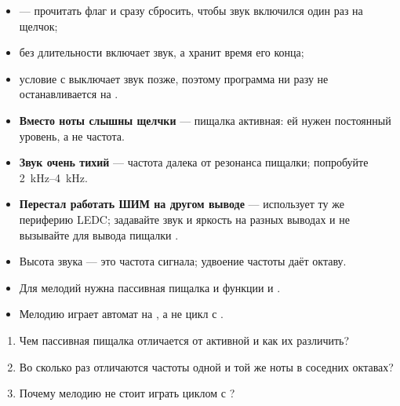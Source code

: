 
\begin{itemize}[leftmargin=*]
  \item {} --- прочитать флаг и сразу сбросить, чтобы звук включился один раз на щелчок;
  \item {} без длительности включает звук, а  хранит время его конца;
  \item условие с  выключает звук позже, поэтому программа ни разу не останавливается на .
\end{itemize}

\begin{trouble}
\begin{itemize}[leftmargin=*]
  \item \textbf{Вместо ноты слышны щелчки} --- пищалка активная: ей нужен постоянный уровень, а не частота.
  \item \textbf{Звук очень тихий} --- частота далека от резонанса пищалки; попробуйте \SIrange{2}{4}{kHz}.
  \item \textbf{Перестал работать ШИМ на другом выводе} ---  использует ту же периферию LEDC;
        задавайте звук и яркость на разных выводах и не вызывайте для вывода пищалки .
\end{itemize}
\end{trouble}

\begin{summary}
\begin{itemize}[leftmargin=*]
  \item Высота звука --- это частота сигнала; удвоение частоты даёт октаву.
  \item Для мелодий нужна пассивная пищалка и функции  и .
  \item Мелодию играет автомат на , а не цикл с .
\end{itemize}
\end{summary}

\begin{selfcheck}
\begin{enumerate}
  \item Чем пассивная пищалка отличается от активной и как их различить?
  \item Во сколько раз отличаются частоты одной и той же ноты в соседних октавах?
  \item Почему мелодию не стоит играть циклом с ?
\end{enumerate}
\end{selfcheck}

